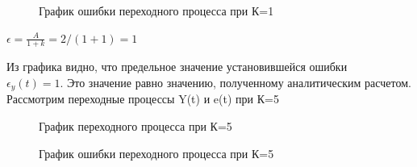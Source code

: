 \documentclass[a4paper, 11pt]{article}
\begin{document}
\begin{figure}[h!]
    \caption{График ошибки переходного процесса при К=1}
    \label{tree}
\end{figure}

\newpage 

\large{$\epsilon=\frac {A}{1+k} = 2/(1+1) = 1$}

Из графика видно, что предельное значение установившейся ошибки \\ $\epsilon_y(t) = 1$. Это значение равно значению, полученному аналитическим расчетом.\\

Рассмотрим переходные процессы Y(t) и e(t) при К=5
\begin{figure}[h!]
    \caption{График переходного процесса при К=5}
    \label{four}
\end{figure}

\begin{figure}[h!]
    \caption{График ошибки переходного процесса при К=5}
    \label{tree}
\end{figure}
\end{document}

